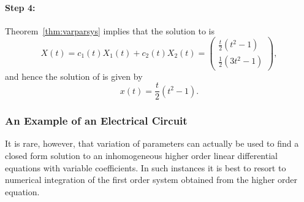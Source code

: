\documentclass{ximera}
\begin{document}
\paragraph{Step 4:}  Theorem~\ref{thm:varparsys} implies that the 
solution to  is
\[
X(t) = c_1(t)X_1(t) + c_2(t)X_2(t) = \left(\begin{array}{c}
\frac{t}{2}(t^2-1)\\ \frac{1}{2}(3t^2-1) \end{array}\right),
\]
and hence the solution of  is given by
\[
x(t) = \frac{t}{2}(t^2-1).
\]

\subsubsection*{An Example of an Electrical Circuit}

It is rare, however, that variation of parameters can actually be 
used to find a closed form solution 
to an inhomogeneous higher order 
linear differential equations with variable coefficients.  In such 
instances it is best to resort to numerical integration of the first 
order system obtained from the higher order equation.   
\end{document}
